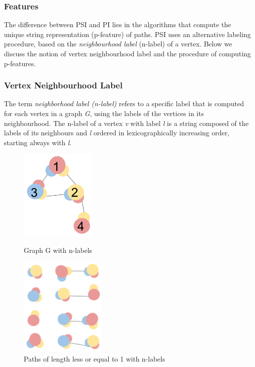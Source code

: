 \documentclass{l4proj}
\begin{document}
\subsubsection{Features}
The difference between PSI and PI lies in the algorithms that compute the unique string representation (p-feature) of paths. PSI uses an alternative labeling procedure, based on the \emph{neighbourhood label} (n-label) of a vertex. Below we discuss the notion of vertex neighbourhood label and the procedure of computing p-features.

\subsubsection{Vertex Neighbourhood Label}
The term \emph{neighborhood label (n-label)} refers to a specific label that is computed for each vertex in a graph \emph{G}, using the labels of the vertices in its neighbourhood. The n-label of a vertex \emph{v} with label \emph{l} is a string composed of the labels of its neighbours and \emph{l} ordered in lexicographically increasing order, starting always with \emph{l}.

\begin{figure}
\centering
\begin{minipage}[t]{.4\textwidth}
  \centering
  \includegraphics[height=4.4cm,width=3.7cm]{images/graphs/nlabels.png}
  \caption{Graph G with n-labels}
  \label{nlabels}
\end{minipage}
\begin{minipage}[t]{.4\textwidth}
  \centering
  \includegraphics[height=4.8cm,width=4.2cm]{images/nfeatures.png}
  \caption{Paths of length less or equal to 1 with n-labels}
  \label{nfeatures}
\end{minipage}
\end{figure}
\end{document}
